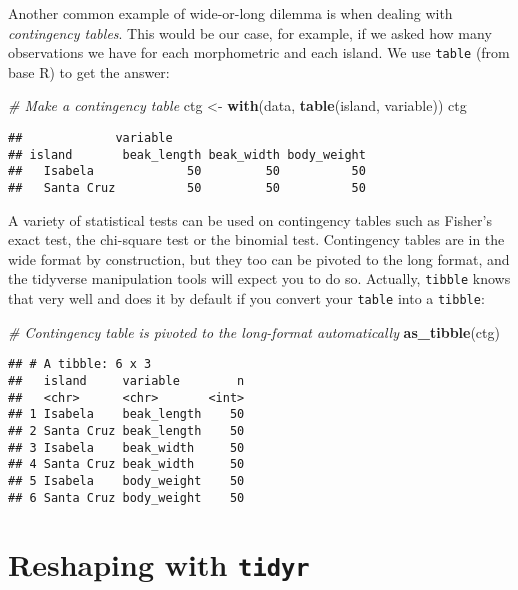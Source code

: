 \documentclass[
]{book}
\newenvironment{Shaded}{}{}
\newcommand{\CommentTok}[1]{\textcolor[rgb]{0.38,0.63,0.69}{\textit{#1}}}
\newcommand{\KeywordTok}[1]{\textcolor[rgb]{0.00,0.44,0.13}{\textbf{#1}}}
\newcommand{\NormalTok}[1]{#1}
\newcommand{\StringTok}[1]{\textcolor[rgb]{0.25,0.44,0.63}{#1}}
\begin{document}
Another common example of wide-or-long dilemma is when dealing with \emph{contingency tables}. This would be our case, for example, if we asked how many observations we have for each morphometric and each island. We use \texttt{table} (from base R) to get the answer:

\begin{Shaded}
\begin{Highlighting}[]
\CommentTok{# Make a contingency table}
\NormalTok{ctg <-}\StringTok{ }\KeywordTok{with}\NormalTok{(data, }\KeywordTok{table}\NormalTok{(island, variable))}
\NormalTok{ctg}
\end{Highlighting}
\end{Shaded}

\begin{verbatim}
##             variable
## island       beak_length beak_width body_weight
##   Isabela             50         50          50
##   Santa Cruz          50         50          50
\end{verbatim}

A variety of statistical tests can be used on contingency tables such as Fisher's exact test, the chi-square test or the binomial test. Contingency tables are in the wide format by construction, but they too can be pivoted to the long format, and the tidyverse manipulation tools will expect you to do so. Actually, \texttt{tibble} knows that very well and does it by default if you convert your \texttt{table} into a \texttt{tibble}:

\begin{Shaded}
\begin{Highlighting}[]
\CommentTok{# Contingency table is pivoted to the long-format automatically}
\KeywordTok{as_tibble}\NormalTok{(ctg)}
\end{Highlighting}
\end{Shaded}

\begin{verbatim}
## # A tibble: 6 x 3
##   island     variable        n
##   <chr>      <chr>       <int>
## 1 Isabela    beak_length    50
## 2 Santa Cruz beak_length    50
## 3 Isabela    beak_width     50
## 4 Santa Cruz beak_width     50
## 5 Isabela    body_weight    50
## 6 Santa Cruz body_weight    50
\end{verbatim}

\hypertarget{reshaping-with-tidyr}{%
\section{\texorpdfstring{Reshaping with \texttt{tidyr}}{Reshaping with tidyr}}\label{reshaping-with-tidyr}}
\end{document}

